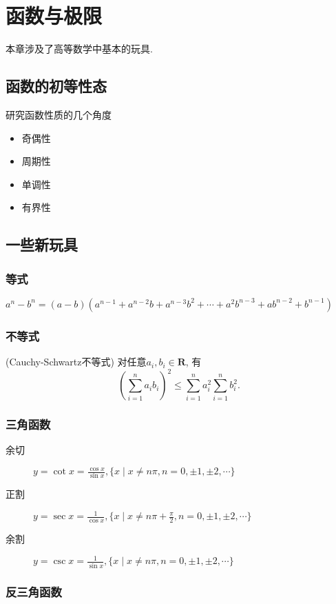 \section{函数与极限}

本章涉及了高等数学中基本的玩具.

\subsection{函数的初等性态}{研究函数性质的几个角度}
\begin{itemize}
\item 奇偶性
\item 周期性
\item 单调性
\item 有界性
\end{itemize}

\subsection{一些新玩具}
\subsubsection{等式}
\(a^n-b^n=(a-b)(a^{n-1}+a^{n-2}b+a^{n-3}b^2+\cdots+a^2b^{n-3}+ab^{n-2}+b^{n-1})\)

\subsubsection{不等式}
(Cauchy-Schwartz不等式) 对任意\(a_i,b_i\in\mathbf{R}\), 有
\[\left(\sum_{i=1}^na_ib_i\right)^2\le\sum_{i=1}^na_i^2\sum_{i=1}^nb_i^2.\]

\subsubsection{三角函数}
\begin{description}
\item[余切] \(\displaystyle y=\cot x=\frac{\cos x}{\sin x},\{x\mid x\ne n\pi,n=0,\pm 1,\pm 2,\cdots\}\)
\item[正割] \(\displaystyle y=\sec x=\frac{1}{\cos x},\{x\mid x\ne n\pi+\frac{\pi}{2},n=0,\pm 1,\pm 2,\cdots\}\)
\item[余割] \(\displaystyle y=\csc x=\frac{1}{\sin x},\{x\mid x\ne n\pi,n=0,\pm 1,\pm 2,\cdots\}\)
\end{description}

\subsubsection{反三角函数}

